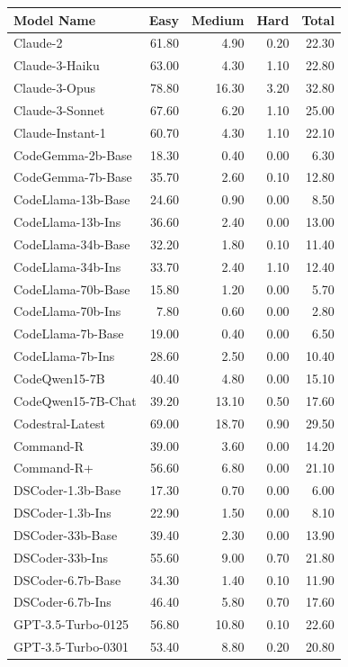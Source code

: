 \begin{table}[ht]
\centering
\begin{tabular}{lrrrr}
    \hline
Model Name & Easy & Medium & Hard & Total \\
    \hline
Claude-2 & 61.80& 4.90& 0.20& 22.30\\
Claude-3-Haiku & 63.00& 4.30& 1.10& 22.80\\
Claude-3-Opus & 78.80& 16.30& 3.20& 32.80\\
Claude-3-Sonnet & 67.60& 6.20& 1.10& 25.00\\
Claude-Instant-1 & 60.70& 4.30& 1.10& 22.10\\
CodeGemma-2b-Base & 18.30& 0.40& 0.00& 6.30\\
CodeGemma-7b-Base & 35.70& 2.60& 0.10& 12.80\\
CodeLlama-13b-Base & 24.60& 0.90& 0.00& 8.50\\
CodeLlama-13b-Ins & 36.60& 2.40& 0.00& 13.00\\
CodeLlama-34b-Base & 32.20& 1.80& 0.10& 11.40\\
CodeLlama-34b-Ins & 33.70& 2.40& 1.10& 12.40\\
CodeLlama-70b-Base & 15.80& 1.20& 0.00& 5.70\\
CodeLlama-70b-Ins & 7.80& 0.60& 0.00& 2.80\\
CodeLlama-7b-Base & 19.00& 0.40& 0.00& 6.50\\
CodeLlama-7b-Ins & 28.60& 2.50& 0.00& 10.40\\
CodeQwen15-7B & 40.40& 4.80& 0.00& 15.10\\
CodeQwen15-7B-Chat & 39.20& 13.10& 0.50& 17.60\\
Codestral-Latest & 69.00& 18.70& 0.90& 29.50\\
Command-R & 39.00& 3.60& 0.00& 14.20\\
Command-R+ & 56.60& 6.80& 0.00& 21.10\\
DSCoder-1.3b-Base & 17.30& 0.70& 0.00& 6.00\\
DSCoder-1.3b-Ins & 22.90& 1.50& 0.00& 8.10\\
DSCoder-33b-Base & 39.40& 2.30& 0.00& 13.90\\
DSCoder-33b-Ins & 55.60& 9.00& 0.70& 21.80\\
DSCoder-6.7b-Base & 34.30& 1.40& 0.10& 11.90\\
DSCoder-6.7b-Ins & 46.40& 5.80& 0.70& 17.60\\
GPT-3.5-Turbo-0125 & 56.80& 10.80& 0.10& 22.60\\
GPT-3.5-Turbo-0301 & 53.40& 8.80& 0.20& 20.80\\

\end{tabular}
\end{table}
